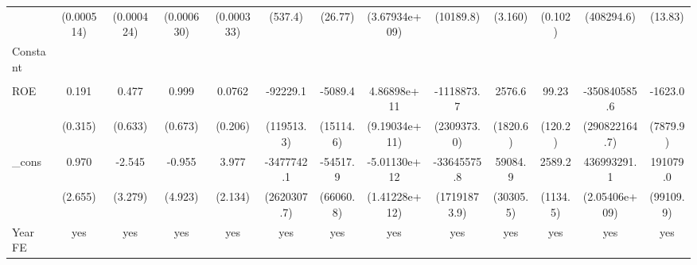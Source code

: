 \begin{table}[htbp]
\begin{tabular}{l*{12}{c}}
                    &  (0.000514)         &  (0.000424)         &  (0.000630)         &  (0.000333)         &     (537.4)         &     (26.77)         &(3.67934e+09)         &   (10189.8)         &     (3.160)         &     (0.102)         &  (408294.6)         &     (13.83)         \\
Constant            &                     &                     &                     &                     &                     &                     &                     &                     &                     &                     &                     &                     \\
                    &                     &                     &                     &                     &                     &                     &                     &                     &                     &                     &                     &                     \\
ROE                 &       0.191         &       0.477         &       0.999         &      0.0762         &    -92229.1         &     -5089.4         & 4.86898e+11         &  -1118873.7         &      2576.6         &       99.23         &-350840585.6         &     -1623.0         \\
                    &     (0.315)         &     (0.633)         &     (0.673)         &     (0.206)         &  (119513.3)         &   (15114.6)         &(9.19034e+11)         & (2309373.0)         &    (1820.6)         &     (120.2)         &(290822164.7)         &    (7879.9)         \\
\_cons              &       0.970         &      -2.545         &      -0.955         &       3.977\sym{*}  &  -3477742.1         &    -54517.9         &-5.01130e+12\sym{***}& -33645575.8\sym{*}  &     59084.9\sym{*}  &      2589.2\sym{**} & 436993291.1         &    191079.0\sym{*}  \\
                    &     (2.655)         &     (3.279)         &     (4.923)         &     (2.134)         & (2620307.7)         &   (66060.8)         &(1.41228e+12)         &(17191873.9)         &   (30305.5)         &    (1134.5)         &(2.05406e+09)         &   (99109.9)         \\
\hline
Year FE             &         yes         &         yes         &         yes         &         yes         &         yes         &         yes         &         yes         &         yes         &         yes         &         yes         &         yes         &         yes         \\

\end{tabular}
\end{table}
